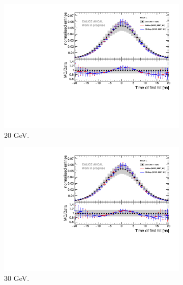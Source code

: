 \begin{figure}[t]
\begin{subfigure}[t]{0.45\textwidth}
		\includegraphics[width=1\textwidth]{chap5/fig_AHCAL_timing/Electrons/Comparison_SimData_Electrons20GeV.pdf}
		\caption{20 GeV.}\label{fig:elec_sim_data_20GeV}
	\end{subfigure}
	\hfill
	\begin{subfigure}[t]{0.45\textwidth}
		\centering
		\includegraphics[width=1\textwidth]{chap5/fig_AHCAL_timing/Electrons/Comparison_SimData_Electrons30GeV.pdf}
		\caption{30 GeV.}\label{fig:elec_sim_data_30GeV}
	\end{subfigure}
	\hfill
	\begin{subfigure}[t]{0.45\textwidth}
		\centering

\end{subfigure}
\end{figure}
